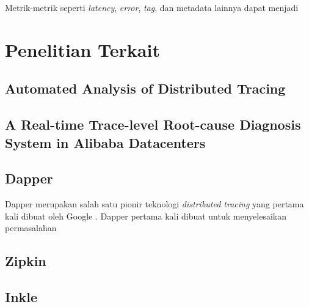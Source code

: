 Metrik-metrik seperti \textit{latency}, \textit{error}, \textit{tag}, dan metadata lainnya dapat menjadi 


\section{Penelitian Terkait}

\subsection{Automated Analysis of Distributed Tracing}

\subsection{A Real-time Trace-level Root-cause Diagnosis System in Alibaba Datacenters}



\subsection{Dapper}

Dapper merupakan salah satu pionir teknologi \textit{distributed tracing} yang pertama kali dibuat oleh Google \citep{dapper-paper}. Dapper pertama kali dibuat untuk menyelesaikan permasalahan 

\subsection{Zipkin}

\subsection{Inkle}

